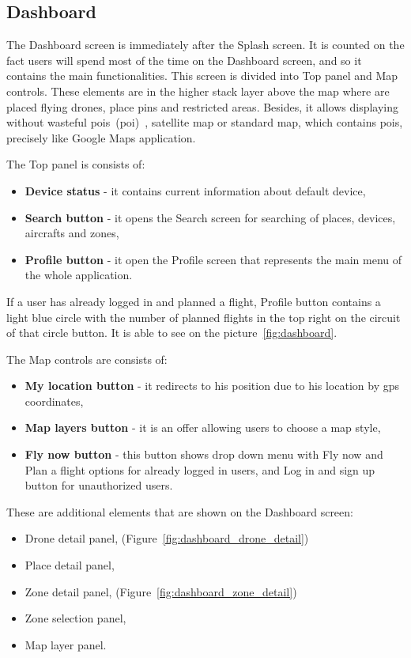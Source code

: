 \subsection{Dashboard}\label{subsec:dashboard2}

The Dashboard screen is immediately after the Splash screen.
It is counted on the fact users will spend most of the time on the Dashboard screen, and so it contains the main functionalities.
This screen is divided into Top panel and Map controls.
These elements are in the higher stack layer above the map where are placed flying drones, place pins and restricted areas.
Besides, it allows displaying without wasteful \acrshort{poi}s~(\acrlong{poi})~\cite{poi}, satellite map or standard map, which contains \acrshort{poi}s, precisely like Google Maps application.

The Top panel is consists of:
\begin{itemize}
    \item \textbf{Device status} - it contains current information about default device,
    \item \textbf{Search button} - it opens the Search screen for searching of places, devices, aircrafts and zones,
    \item \textbf{Profile button} - it open the Profile screen that represents the main menu of the whole application.
\end{itemize}
If a user has already logged in and planned a flight, Profile button contains a light blue circle with the number of planned flights in the top right on the circuit of that circle button.
It is able to see on the picture~\ref{fig:dashboard}.

The Map controls are consists of:
\begin{itemize}
    \item \textbf{My location button} - it redirects to his position due to his location by \acrshort{gps} coordinates,
    \item \textbf{Map layers button} - it is an offer allowing users to choose a map style,
    \item \textbf{Fly now button} - this button shows drop down menu with Fly now and Plan a flight options for already logged in users, and Log in and sign up button for unauthorized users.
\end{itemize}
\newpage
These are additional elements that are shown on the Dashboard screen:
\begin{itemize}
    \item Drone detail panel, (Figure~\ref{fig:dashboard_drone_detail})
    \item Place detail panel,
    \item Zone detail panel, (Figure~\ref{fig:dashboard_zone_detail})
    \item Zone selection panel,
    \item Map layer panel.
\end{itemize}

